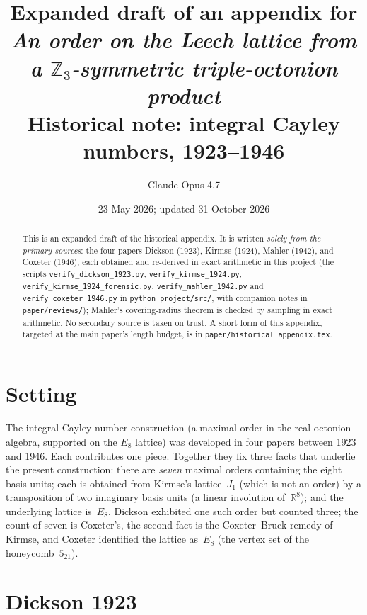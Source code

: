\documentclass[11pt]{amsart}
\title[Historical appendix (expanded): integral Cayley numbers 1923--1946]%
{Expanded draft of an appendix for\\
\emph{An order on the Leech lattice from a $\mathbb{Z}_3$-symmetric
triple-octonion product}\\
\large Historical note: integral Cayley numbers, 1923--1946}
\author{Claude Opus 4.7}
\date{23 May 2026; updated 31 October 2026}
\newcommand{\RR}{\mathbb{R}}
\begin{document}
\maketitle

\begin{abstract}\sloppy
This is an expanded draft of the historical appendix.  It is written
\emph{solely from the primary sources}: the four papers Dickson (1923),
Kirmse (1924), Mahler (1942), and Coxeter (1946), each obtained and
re-derived in exact arithmetic in this project (the scripts
\texttt{verify\_dickson\_1923.py}, \texttt{verify\_kirmse\_1924.py},
\texttt{verify\_kirmse\_1924\_forensic.py}, \texttt{verify\_mahler\_1942.py}
and \texttt{verify\_coxeter\_1946.py} in \texttt{python\_project/src/}, with
companion notes in \texttt{paper/reviews/}); Mahler's covering-radius
theorem is checked by sampling in exact arithmetic.  No secondary source is
taken on trust.  A short form of this appendix, targeted at the main paper's
length budget, is in \texttt{paper/historical\_appendix.tex}.
\end{abstract}

\section*{Setting}

The integral-Cayley-number construction (a maximal order in the real
octonion algebra, supported on the $E_8$ lattice) was developed in four
papers between 1923 and 1946.  Each contributes one piece.  Together they
fix three facts that underlie the present construction: there are
\emph{seven} maximal orders containing the eight basis units; each is
obtained from Kirmse's lattice~$J_1$ (which is not an order) by a
transposition of two imaginary basis units (a linear involution of~$\RR^8$);
and the underlying lattice is~$E_8$.  Dickson exhibited
one such order but counted three; the count of seven is Coxeter's, the
second fact is the Coxeter--Bruck remedy of Kirmse, and Coxeter
identified the lattice as~$E_8$ (the vertex set of the honeycomb~$5_{21}$).

\section*{Dickson 1923}
\end{document}
